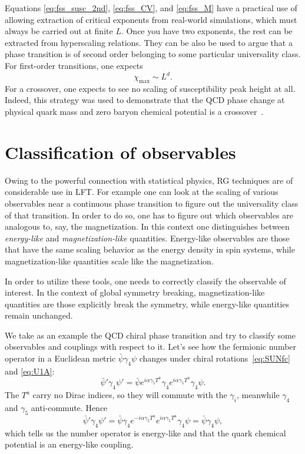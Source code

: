 Equations \eqref{eq:fss_susc_2nd}, \eqref{eq:fss_CV}, and \eqref{eq:fss_M} 
have a practical use of
allowing extraction of critical exponents from real-world simulations,
which must always be carried out at finite $L$.
Once you have two exponents, the rest can be extracted from hyperscaling relations.
They can be also be used to argue that a phase transition is of second order
belonging to some particular universality class. For first-order transitions,
one expects~\cite{fisher_scaling_1982}
\begin{equation}\label{eq:fss_susc_1st}
    \chi_{\text{max}}\sim L^d.
\end{equation}
For a crossover, one expects to see no scaling of susceptibility peak height
at all. Indeed, this strategy was used to demonstrate that the QCD phase change
at physical quark mass and zero baryon chemical potential 
is a crossover~\cite{aoki_order_2006}.
 

\section{Classification of observables}


Owing to the powerful connection with statistical physics, RG techniques are of
considerable use in LFT. For example one can look at the scaling of various
observables near a continuous phase transition to figure out the universality
class of that transition. In order to do so, one has to figure out which
observables are analogous to, say, the magnetization. In this context one
distinguishes between {\it energy-like} and {\it
magnetization-like} quantities. Energy-like
observables are those that have the same scaling behavior as the energy density
in spin systems, while magnetization-like quantities scale like the
magnetization.

In order to utilize these tools, one needs to correctly classify the observable
of interest. In the context of global symmetry breaking, magnetization-like
quantities are those explicitly break the symmetry, while energy-like quantities
remain unchanged.

We take as an example the QCD chiral phase transition and try to classify some
observables and couplings with respect to it. Let's see how the fermionic
number operator in a Euclidean metric $\bar{\psi}\gamma_4\psi$ changes under
chiral rotations~\eqref{eq:SUNfc} and \eqref{eq:U1A}:
\begin{equation}
  \bar{\psi}'\gamma_4\psi'
    =\bar{\psi}e^{i\alpha\gamma_5T^a}\gamma_4e^{i\alpha\gamma_5T^a}\gamma_4\psi.
\end{equation}
The $T^a$ carry no Dirac indices, so they will commute with the $\gamma_i$,
meanwhile $\gamma_4$ and $\gamma_5$ anti-commute. Hence
\begin{equation}
  \bar{\psi}'\gamma_4\psi'
    =\bar{\psi}\gamma_4e^{-i\alpha\gamma_5T^a}e^{i\alpha\gamma_5T^a}\gamma_4\psi
    =\bar{\psi}\gamma_4\psi,
\end{equation}
which tells us the number operator is energy-like and that the quark chemical
potential is an energy-like coupling.

